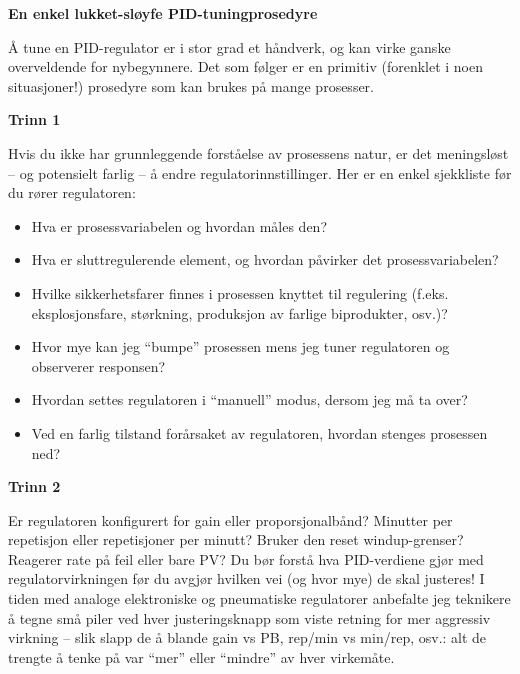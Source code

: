 \vfil \eject

\centerline{\bf En enkel lukket-sløyfe PID-tuningprosedyre}

\vskip 10pt

Å tune en PID-regulator er i stor grad et håndverk, og kan virke ganske overveldende for nybegynnere. Det som følger er en primitiv (forenklet i noen situasjoner!) prosedyre som kan brukes på mange prosesser.

\vskip 10pt

\noindent
{\bf Trinn 1}

 Hvis du ikke har grunnleggende forståelse av prosessens natur, er det meningsløst -- og potensielt farlig -- å endre regulatorinnstillinger. Her er en enkel sjekkliste før du rører regulatoren:

\begin{itemize}
\item{} Hva er prosessvariabelen og hvordan måles den?
\item{} Hva er sluttregulerende element, og hvordan påvirker det prosessvariabelen?
\item{} Hvilke sikkerhetsfarer finnes i prosessen knyttet til regulering (f.eks. eksplosjonsfare, størkning, produksjon av farlige biprodukter, osv.)?
\item{} Hvor mye kan jeg ``bumpe'' prosessen mens jeg tuner regulatoren og observerer responsen?
\item{} Hvordan settes regulatoren i ``manuell'' modus, dersom jeg må ta over?
\item{} Ved en farlig tilstand forårsaket av regulatoren, hvordan stenges prosessen ned?
\end{itemize}

\vskip 10pt

\noindent
{\bf Trinn 2}

 Er regulatoren konfigurert for gain eller proporsjonalbånd? Minutter per repetisjon eller repetisjoner per minutt? Bruker den reset windup-grenser? Reagerer rate på feil eller bare PV? Du bør forstå hva PID-verdiene gjør med regulatorvirkningen før du avgjør hvilken vei (og hvor mye) de skal justeres! I tiden med analoge elektroniske og pneumatiske regulatorer anbefalte jeg teknikere å tegne små piler ved hver justeringsknapp som viste retning for mer aggressiv virkning -- slik slapp de å blande gain vs PB, rep/min vs min/rep, osv.: alt de trengte å tenke på var ``mer'' eller ``mindre'' av hver virkemåte.

